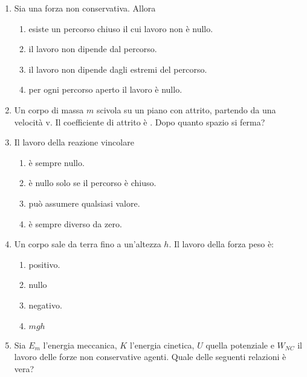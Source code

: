 \documentclass{article}
\begin{document}
\begin{enumerate}
  \item Sia  una forza non conservativa. Allora
  \begin{enumerate}[label=\Alph*.]
    \item esiste un percorso chiuso il cui lavoro non è nullo.
    \item il lavoro non dipende dal percorso.
    \item il lavoro non dipende dagli estremi del percorso.
    \item per ogni percorso aperto il lavoro è nullo.
  \end{enumerate}
  \item Un corpo di massa $m$ scivola su un piano con attrito, partendo da una velocità v. Il coefficiente di attrito è \mu. Dopo quanto spazio si ferma?
  \begin{enumerate}[label=\Alph*.]
    \item $\frac{1}{2}v^2-\mu g$.
    \item $\frac{2v^2}{g\mu}}$.
    \item $\frac{1}{2}v^2+\mu g$.
    \item $\frac{v^2}{2g\mu}}$.
  \end{enumerate}
  \item Il lavoro della reazione vincolare
  \begin{enumerate}[label=\Alph*.]
    \item è sempre nullo.
    \item è nullo solo se il percorso è chiuso.
    \item può assumere qualsiasi valore.
    \item è sempre diverso da zero.
  \end{enumerate}
  \item Un corpo sale da terra fino a un'altezza $h$. Il lavoro della forza peso è:
  \begin{enumerate}[label=\Alph*.]
    \item positivo.
    \item nullo
    \item negativo.
    \item $mgh$
  \end{enumerate}
  \item Sia $E_m$ l'energia meccanica, $K$ l'energia cinetica, $U$ quella potenziale e $W_{NC}$ il lavoro delle forze non conservative agenti. Quale delle seguenti relazioni è vera?
  \begin{enumerate}[label=\Alph*.]

\end{enumerate}
\end{enumerate}
\end{document}
